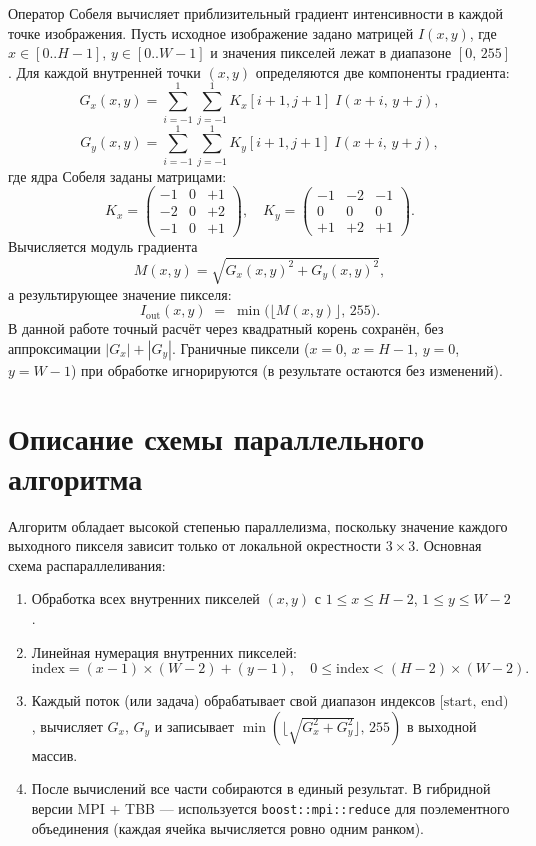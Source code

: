 \documentclass[12pt]{article}
\begin{document}
Оператор Собеля вычисляет приблизительный градиент интенсивности в каждой точке изображения. Пусть исходное изображение задано матрицей $I(x,y)$, где $x\in[0..H-1],\,y\in[0..W-1]$ и значения пикселей лежат в диапазоне $[0,\,255]$. Для каждой внутренней точки $(x,y)$ определяются две компоненты градиента:
\[
G_x(x,y) = \sum_{i=-1}^{1} \sum_{j=-1}^{1} K_x[i+1,j+1]\;I(x+i,\,y+j),
\]
\[
G_y(x,y) = \sum_{i=-1}^{1} \sum_{j=-1}^{1} K_y[i+1,j+1]\;I(x+i,\,y+j),
\]
где ядра Собеля заданы матрицами:
\[
K_x = 
\begin{pmatrix}
-1 & 0 & +1 \\
-2 & 0 & +2 \\
-1 & 0 & +1
\end{pmatrix},\quad
K_y = 
\begin{pmatrix}
-1 & -2 & -1 \\
 0 &  0 &  0 \\
+1 & +2 & +1
\end{pmatrix}.
\]
Вычисляется модуль градиента
\[
M(x,y) = \sqrt{G_x(x,y)^2 + G_y(x,y)^2},
\]
а результирующее значение пикселя:
\[
I_{\text{out}}(x,y) \;=\; \min\bigl(\lfloor M(x,y)\rfloor,\,255\bigr).
\]
В данной работе точный расчёт через квадратный корень сохранён, без аппроксимации $|G_x| + |G_y|$. Граничные пиксели ($x=0$, $x=H-1$, $y=0$, $y=W-1$) при обработке игнорируются (в результате остаются без изменений).


\section{Описание схемы параллельного алгоритма}

Алгоритм обладает высокой степенью параллелизма, поскольку значение каждого выходного пикселя зависит только от локальной окрестности $3\times 3$. Основная схема распараллеливания:
\begin{enumerate}
    \item Обработка всех внутренних пикселей $(x,y)$ с $1 \le x \le H-2$, $1 \le y \le W-2$.
    \item Линейная нумерация внутренних пикселей: 
    \[
    \text{index} = (x - 1)\times (W - 2) + (y - 1),\quad 
    0 \le \text{index} < (H - 2)\times (W - 2).
    \]
    \item Каждый поток (или задача) обрабатывает свой диапазон индексов $\bigl[\text{start},\,\text{end}\bigr)$, вычисляет $G_x,\,G_y$ и записывает $\min(\lfloor\sqrt{G_x^2+G_y^2}\rfloor,\,255)$ в выходной массив.
    \item После вычислений все части собираются в единый результат. В гибридной версии MPI + TBB — используется \texttt{boost::mpi::reduce} для поэлементного объединения (каждая ячейка вычисляется ровно одним ранком).
\end{enumerate}
\end{document}
